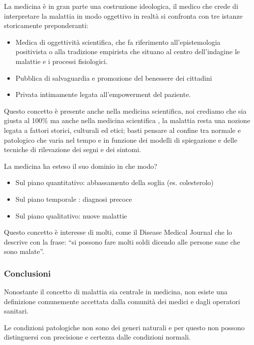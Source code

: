   La medicina è in gran parte una costruzione ideologica, il medico che
  crede di interpretare la malattia in modo oggettivo in realtà si
  confronta con tre istanze storicamente preponderanti:

\begin{itemize}
\item
  Medica di oggettività scientifica, che fa riferimento
  all'epistemologia positivista o alla tradizione empirista che situano
  al centro dell'indagine le malattie e i processi fisiologici.
\item
  Pubblica di salvaguardia e promozione del benessere dei cittadini
\item
  Privata intimamente legata all'empowerment del paziente.
\end{itemize}

  Questo concetto è presente anche nella medicina scientifica, noi
  crediamo che sia giusta al 100\% ma anche nella medicina scientifica ,
  la malattia resta una nozione legata a fattori storici, culturali ed
  etici; basti pensare al confine tra normale e patologico che varia nel
  tempo e in funzione dei modelli di spiegazione e delle tecniche di
  rilevazione dei segni e dei sintomi.

  La medicina ha esteso il suo dominio in che modo?

\begin{itemize}
\item
  Sul piano quantitativo: abbassamento della soglia (es. colesterolo)
\item
  Sul piano temporale : diagnosi precoce
\item
  Sul piano qualitativo: nuove malattie
\end{itemize}

  Questo concetto è interesse di molti, come il Disease Medical Journal
  che lo descrive con la frase: ``si possono fare molti soldi dicendo
  alle persone sane che sono malate''.

  \subsubsection{Conclusioni}

  Nonostante il concetto di malattia sia centrale in medicina, non
  esiste una definizione comunemente accettata dalla comunità dei medici
  e dagli operatori sanitari.

  Le condizioni patologiche non sono dei generi naturali e per questo
  non possono distinguersi con precisione e certezza dalle condizioni
  normali.

